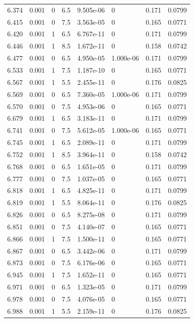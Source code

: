 \documentclass[preview]{standalone}
\begin{document}
{{{{{{{\begin{tabular}{L{1.2cm}C{1.2cm} C{0.3cm}C{0.5cm} C{1.4cm}C{1.4cm} C{1.4cm}C{1.4cm}}
  6.374  &  0.001  & 0     & 6.5 &  9.505e-06  & 0  & 0.171 &  0.0799   \\ 
  6.415  &  0.001  & 0     & 7.5 &  3.563e-05  & 0  & 0.165 &  0.0771   \\ 
  6.420  &  0.001  & 1     & 6.5 &  6.767e-11  & 0  & 0.171 &  0.0799   \\ 
  6.446  &  0.001  & 1     & 8.5 &  1.672e-11  & 0  & 0.158 &  0.0742   \\ 
  6.477  &  0.001  & 0     & 6.5 &  4.950e-05  & 1.000e-06  & 0.171 &  0.0799   \\ 
  6.533  &  0.001  & 1     & 7.5 &  1.187e-10  & 0  & 0.165 &  0.0771   \\ 
  6.567  &  0.001  & 1     & 5.5 &  2.455e-11  & 0  & 0.176 &  0.0825   \\ 
  6.569  &  0.001  & 0     & 6.5 &  7.360e-05  & 1.000e-06  & 0.171 &  0.0799   \\ 
  6.570  &  0.001  & 0     & 7.5 &  4.953e-06  & 0  & 0.165 &  0.0771   \\ 
  6.679  &  0.001  & 1     & 6.5 &  3.183e-11  & 0  & 0.171 &  0.0799   \\ 
  6.741  &  0.001  & 0     & 7.5 &  5.612e-05  & 1.000e-06  & 0.165 &  0.0771   \\ 
  6.745  &  0.001  & 1     & 6.5 &  2.089e-11  & 0  & 0.171 &  0.0799   \\ 
  6.752  &  0.001  & 1     & 8.5 &  3.964e-11  & 0  & 0.158 &  0.0742   \\ 
  6.768  &  0.001  & 0     & 6.5 &  1.651e-05  & 0  & 0.171 &  0.0799   \\ 
  6.777  &  0.001  & 0     & 7.5 &  1.037e-05  & 0  & 0.165 &  0.0771   \\ 
  6.818  &  0.001  & 1     & 6.5 &  4.825e-11  & 0  & 0.171 &  0.0799   \\ 
  6.819  &  0.001  & 1     & 5.5 &  8.064e-11  & 0  & 0.176 &  0.0825   \\ 
  6.826  &  0.001  & 0     & 6.5 &  8.275e-08  & 0  & 0.171 &  0.0799   \\ 
  6.851  &  0.001  & 0     & 7.5 &  4.140e-07  & 0  & 0.165 &  0.0771   \\ 
  6.866  &  0.001  & 1     & 7.5 &  1.500e-11  & 0  & 0.165 &  0.0771   \\ 
  6.867  &  0.001  & 0     & 6.5 &  3.442e-06  & 0  & 0.171 &  0.0799   \\ 
  6.873  &  0.001  & 0     & 7.5 &  6.176e-06  & 0  & 0.165 &  0.0771   \\ 
  6.945  &  0.001  & 1     & 7.5 &  1.652e-11  & 0  & 0.165 &  0.0771   \\ 
  6.971  &  0.001  & 0     & 6.5 &  1.323e-05  & 0  & 0.171 &  0.0799   \\ 
  6.978  &  0.001  & 0     & 7.5 &  4.076e-05  & 0  & 0.165 &  0.0771   \\ 
  6.988  &  0.001  & 1     & 5.5 &  2.159e-11  & 0  & 0.176 &  0.0825   \\ 
\hline 
\end{tabular} 

}}}}}}}
\end{document}
